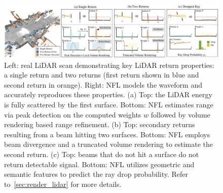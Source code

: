 \begin{figure}[t]
\centering
\includegraphics[width=1.0\columnwidth]{main/images/overview.pdf}
\caption{Left: real LiDAR scan demonstrating key LiDAR return properties: a \textcolor{mygray}{single return} and two returns (first return shown in \textcolor{myblue}{blue} and second return in \textcolor{myorange}{orange}). Right: NFL models the waveform and accurately reproduces these properties. (a) Top: the LiDAR energy is fully scattered by the first surface. Bottom: NFL estimates range via peak detection on the computed weights $w$ followed by volume rendering based range refinement. (b) Top: secondary returns resulting from a beam hitting two surfaces. Bottom: NFL employs beam divergence and a truncated volume rendering to estimate the second return. (c) Top: beams that do not hit a surface do not return detectable signal. Bottom: NFL utilizes geometric and semantic features to predict the ray drop probability. Refer to~\cref{sec:render_lidar} for more details. }
\label{fig:iccv_overview}
\end{figure}

